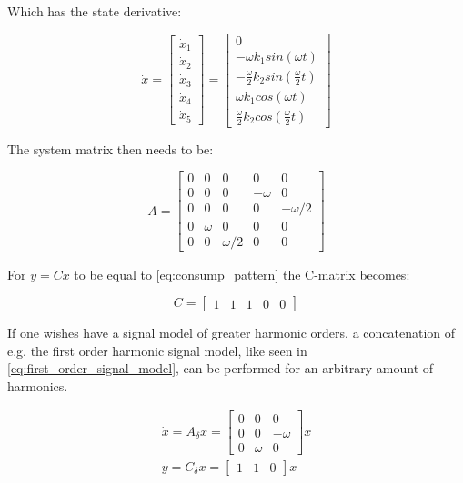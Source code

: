 Which has the state derivative:

\begin{equation} \label{eq:consump_x_deriv_l}
	\dot x =  \begin{bmatrix}
		\dot x_1 \\
		\dot x_2 \\
		\dot x_3 \\
		\dot x_4 \\
		\dot x_5
	\end{bmatrix}
	=
	\begin{bmatrix}
		0 \\
		- \omega k_1 sin(\omega t) \\
		- \frac{\omega}{2} k_2 sin(\frac{\omega}{2} t) \\
		\omega k_1 cos (\omega t) \\
		\frac{\omega}{2} k_2 cos (\frac{\omega}{2} t)
	\end{bmatrix}
\end{equation}


The system matrix then needs to be:

\begin{equation} \label{eq:consump_A}
	A = \begin{bmatrix}
		0 & 0 				& 0					& 0 				& 0 \\
		0 & 0 				& 0					& -\omega 	& 0 \\
		0 & 0				& 0					& 0 				& - \omega/2 \\
		0 & \omega	& 0						& 0 				& 0 \\
		0 & 0				& \omega/2 	& 0					& 0
	\end{bmatrix}
\end{equation}

For $y = Cx$ to be equal to \cref{eq:consump_pattern} the C-matrix becomes: 

\begin{equation}
	C = \begin{bmatrix} 1 & 1 & 1 & 0 & 0 \end{bmatrix}
\end{equation}

If one wishes have a signal model of greater harmonic orders, a concatenation of e.g. the first order harmonic signal model, like seen in \cref{eq:first_order_signal_model}, can be performed for an arbitrary amount of harmonics. 

\begin{equation}\label{eq:first_order_signal_model}
	\begin{gathered}
		\dot{x} = A_\delta x =  \begin{bmatrix}0 & 0 & 0 \\ 0 & 0 & -\omega \\ 0 & \omega & 0	\end{bmatrix}x \\
		y = C_\delta x = \begin{bmatrix} 1 & 1 & 0 \end{bmatrix} x
	\end{gathered}
\end{equation}

